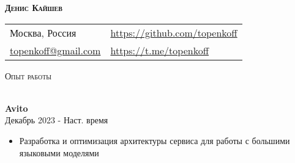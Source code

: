 \documentclass[a4paper]{article}
\newcommand{\lineunder} {
    \vspace*{-8pt} \\
    \hspace*{-18pt} \hrulefill \\
}
\newcommand{\header} [1] {
    {\hspace*{-18pt}\vspace*{6pt} \textsc{#1}}
    \vspace*{-6pt} \lineunder
}
\begin{document}
\vspace*{-40pt}

\vspace*{-10pt}
\begin{center}
    \textbf{{\huge \scshape {Денис Кайшев}}}\\
    \vspace*{10pt}
    \begin{tabular}{l l}
        Москва, Россия & \url{https://github.com/topenkoff} \\
        \href{mailto:topenkoff@gmail.com}{topenkoff@gmail.com} & \url{https://t.me/topenkoff} \\
    \end{tabular}
    \vspace*{15pt}
\end{center}

\header{Опыт работы}
\vspace{1mm}


\textbf{Avito} \\
 \hfill Декабрь 2023 - Наст. время\\
\begin{itemize}[leftmargin=16pt,itemsep=0pt,topsep=-8pt,label={-}]
    \item Разработка и оптимизация архитектуры сервиса для работы с большими языковыми моделями
\end{itemize}
\vspace{\baselineskip}
\end{document}
